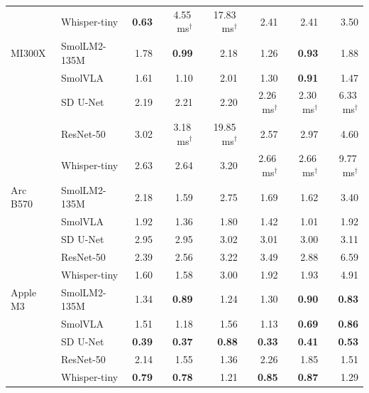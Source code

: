 \begin{tabular}{llrrrrrr}
 & Whisper-tiny & \textbf{0.63} & 4.55\,ms$^\dagger$ & 17.83\,ms$^\dagger$ & 2.41 & 2.41 & 3.50 \\
MI300X & SmolLM2-135M & 1.78 & \textbf{0.99} & 2.18 & 1.26 & \textbf{0.93} & 1.88 \\
 & SmolVLA & 1.61 & 1.10 & 2.01 & 1.30 & \textbf{0.91} & 1.47 \\
 & SD U-Net & 2.19 & 2.21 & 2.20 & 2.26\,ms$^\dagger$ & 2.30\,ms$^\dagger$ & 6.33\,ms$^\dagger$ \\
 & ResNet-50 & 3.02 & 3.18\,ms$^\dagger$ & 19.85\,ms$^\dagger$ & 2.57 & 2.97 & 4.60 \\
 & Whisper-tiny & 2.63 & 2.64 & 3.20 & 2.66\,ms$^\dagger$ & 2.66\,ms$^\dagger$ & 9.77\,ms$^\dagger$ \\
Arc B570 & SmolLM2-135M & 2.18 & 1.59 & 2.75 & 1.69 & 1.62 & 3.40 \\
 & SmolVLA & 1.92 & 1.36 & 1.80 & 1.42 & 1.01 & 1.92 \\
 & SD U-Net & 2.95 & 2.95 & 3.02 & 3.01 & 3.00 & 3.11 \\
 & ResNet-50 & 2.39 & 2.56 & 3.22 & 3.49 & 2.88 & 6.59 \\
 & Whisper-tiny & 1.60 & 1.58 & 3.00 & 1.92 & 1.93 & 4.91 \\
Apple M3 & SmolLM2-135M & 1.34 & \textbf{0.89} & 1.24 & 1.30 & \textbf{0.90} & \textbf{0.83} \\
 & SmolVLA & 1.51 & 1.18 & 1.56 & 1.13 & \textbf{0.69} & \textbf{0.86} \\
 & SD U-Net & \textbf{0.39} & \textbf{0.37} & \textbf{0.88} & \textbf{0.33} & \textbf{0.41} & \textbf{0.53} \\
 & ResNet-50 & 2.14 & 1.55 & 1.36 & 2.26 & 1.85 & 1.51 \\
 & Whisper-tiny & \textbf{0.79} & \textbf{0.78} & 1.21 & \textbf{0.85} & \textbf{0.87} & 1.29 \\
\bottomrule
\end{tabular}
